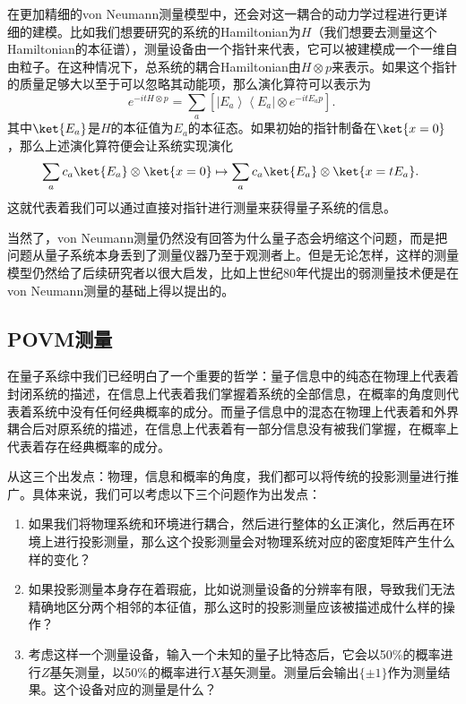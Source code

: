 在更加精细的von Neumann测量模型中，还会对这一耦合的动力学过程进行更详细的建模。比如我们想要研究的系统的Hamiltonian为$H$（我们想要去测量这个Hamiltonian的本征谱），测量设备由一个指针来代表，它可以被建模成一个一维自由粒子。在这种情况下，总系统的耦合Hamiltonian由$H\otimes p$来表示。如果这个指针的质量足够大以至于可以忽略其动能项，那么演化算符可以表示为\begin{equation}
e^{-i t H \otimes p}=\sum_a\left[\left|E_a\right\rangle\left\langle E_a\right| \otimes e^{-i t E_a p}\right].~
\end{equation}
其中$\ket{E_a}$是$H$的本征值为$E_a$的本征态。如果初始的指针制备在$\ket{x=0}$，那么上述演化算符便会让系统实现演化
\begin{equation}
\sum_a c_a\ket{E_a}\otimes\ket{x=0}\mapsto \sum_a c_a \ket{E_a}\otimes \ket{x=tE_a}.~
\end{equation}
这就代表着我们可以通过直接对指针进行测量来获得量子系统的信息。

当然了，von Neumann测量仍然没有回答为什么量子态会坍缩这个问题，而是把问题从量子系统本身丢到了测量仪器乃至于观测者上。但是无论怎样，这样的测量模型仍然给了后续研究者以很大启发，比如上世纪80年代提出的弱测量技术便是在von Neumann测量的基础上得以提出的。

\subsection{POVM测量}

在量子系综中我们已经明白了一个重要的哲学：量子信息中的纯态在物理上代表着封闭系统的描述，在信息上代表着我们掌握着系统的全部信息，在概率的角度则代表着系统中没有任何经典概率的成分。而量子信息中的混态在物理上代表着和外界耦合后对原系统的描述，在信息上代表着有一部分信息没有被我们掌握，在概率上代表着存在经典概率的成分。

从这三个出发点：物理，信息和概率的角度，我们都可以将传统的投影测量进行推广。具体来说，我们可以考虑以下三个问题作为出发点：
\begin{enumerate}
\item 如果我们将物理系统和环境进行耦合，然后进行整体的幺正演化，然后再在环境上进行投影测量，那么这个投影测量会对物理系统对应的密度矩阵产生什么样的变化？
\item 如果投影测量本身存在着瑕疵，比如说测量设备的分辨率有限，导致我们无法精确地区分两个相邻的本征值，那么这时的投影测量应该被描述成什么样的操作？
\item 考虑这样一个测量设备，输入一个未知的量子比特态后，它会以50\%的概率进行$Z$基矢测量，以50\%的概率进行$X$基矢测量。测量后会输出$\{\pm1\}$作为测量结果。这个设备对应的测量是什么？
\end{enumerate}


